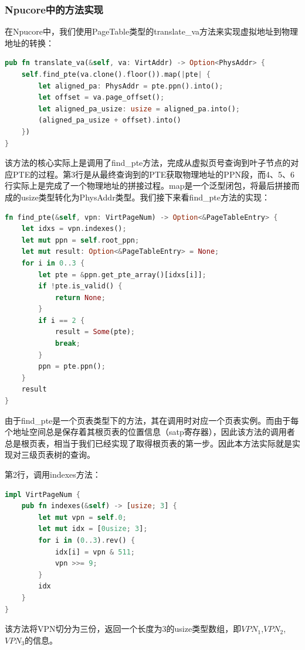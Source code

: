 \subsubsection{Npucore中的方法实现}

在Npucore中，我们使用PageTable类型的translate\_va方法来实现虚拟地址到物理地址的转换：

\begin{lstlisting}[language={Rust}, label={code:pte},
	caption={os/src/mm/page\_table.rs}]
pub fn translate_va(&self, va: VirtAddr) -> Option<PhysAddr> {
	self.find_pte(va.clone().floor()).map(|pte| {
		let aligned_pa: PhysAddr = pte.ppn().into();
		let offset = va.page_offset();
		let aligned_pa_usize: usize = aligned_pa.into();
		(aligned_pa_usize + offset).into()
	})
}
\end{lstlisting}

该方法的核心实际上是调用了find\_pte方法，完成从虚拟页号查询到叶子节点的对应PTE的过程。第3行是从最终查询到的PTE获取物理地址的PPN段，而4、5、6行实际上是完成了一个物理地址的拼接过程。map是一个泛型闭包，将最后拼接而成的usize类型转化为PhysAddr类型。我们接下来看find\_pte方法的实现：

\begin{lstlisting}[language={Rust}, label={code:pte},
	caption={os/src/mm/page\_table.rs}]
fn find_pte(&self, vpn: VirtPageNum) -> Option<&PageTableEntry> {
	let idxs = vpn.indexes();
	let mut ppn = self.root_ppn;
	let mut result: Option<&PageTableEntry> = None;
	for i in 0..3 {
		let pte = &ppn.get_pte_array()[idxs[i]];
		if !pte.is_valid() {
			return None;
		}
		if i == 2 {
			result = Some(pte);
			break;
		}
		ppn = pte.ppn();
	}
	result
}
\end{lstlisting}

由于find\_pte是一个页表类型下的方法，其在调用时对应一个页表实例。而由于每个地址空间总是保存着其根页表的位置信息（satp寄存器），因此该方法的调用者总是根页表，相当于我们已经实现了取得根页表的第一步。因此本方法实际就是实现对三级页表树的查询。

第2行，调用indexes方法：

\begin{lstlisting}[language={Rust}, label={code:pte},
	caption={os/src/mm/address.rs}]
impl VirtPageNum {
	pub fn indexes(&self) -> [usize; 3] {
		let mut vpn = self.0;
		let mut idx = [0usize; 3];
		for i in (0..3).rev() {
			idx[i] = vpn & 511;
			vpn >>= 9;
		}
		idx
	}
}
\end{lstlisting}

该方法将VPN切分为三份，返回一个长度为3的usize类型数组，即$VPN_{1}$,$VPN_{2}$,$VPN_{3}$的信息。

